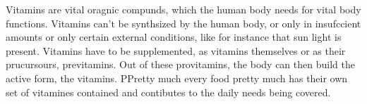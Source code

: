 \documentclass[../main.tex]{subfiles}
\begin{document}
Vitamins are vital oragnic compunds, which the human body needs for vital body functions.
Vitamins can't be synthsized by the human body, or only in insufccient amounts or only certain external conditions,
like for instance that sun light is present.
Vitamins have to be supplemented, as vitamins themselves or as their prucursours, previtamins.
Out of these provitamins, the body can then build the active form, the vitamins.
PPretty much every food pretty much has their own set of vitamines contained and contibutes to the daily needs being covered.
\end{document}
